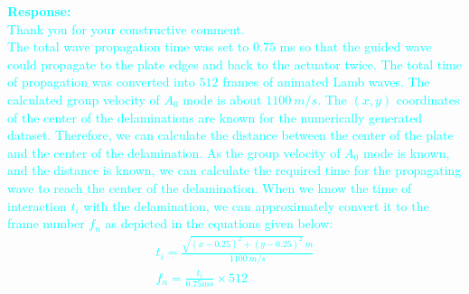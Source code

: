\documentclass[11pt,a2paper]{report}
\begin{document}
{\begin{enumerate}
		\textcolor{Cyan}{
			\textbf{Response:} \\
			Thank you for your constructive comment. \\
			The total wave propagation time was set to \(0.75\) ms so that the guided wave could propagate to the plate edges and back to the actuator twice.
			The total time of propagation was converted into \(512\) frames of animated Lamb waves.
			The calculated group velocity of \(A_0\) mode is about \(1100\ m/s\).
			The \((x, y)\) coordinates of the center of the delaminations are known for the numerically generated dataset.
			Therefore, we can calculate the distance between the center of the plate and the center of the delamination.
			As the group velocity of \(A_0\) mode is known, and the distance is known, we can calculate the required time for the propagating wave to reach the center of the delamination. 
			When we know the time of interaction \(t_i\) with the delamination, we can approximately convert it to the frame number \(f_n\) as depicted in the equations given below:		
				\begin{gather*}
					t_i = \frac{\sqrt{(x-0.25)^2 +(y-0.25)^2} \ m}{1100\ m/s}
					\\
					f_n = \frac{t_i}{0.75ms} \times 512
				\end{gather*}			
		}
	\end{enumerate}
	}
\end{document}
